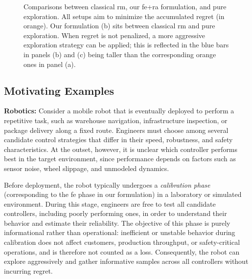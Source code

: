 \documentclass[twoside,11pt]{article}
\begin{document}
\begin{figure}[t]
{{
    }
}
\caption{Comparisons between classical \ac{rm}, our \ac{fe}+\ac{ra} formulation, and pure exploration. All setups aim to minimize the accumulated regret (in orange). Our formulation (b) sits between  classical \ac{rm} and pure exploration. When regret is not penalized, a more aggressive exploration strategy can be applied; this is reflected in the  blue bars in panels (b) and (c) being taller than the corresponding orange ones in panel (a).}
\label{fig:comparison_formulation}
\end{figure}







\subsection{Motivating Examples}\label{sec:examples}
\textbf{Robotics:}
Consider a mobile robot that is eventually deployed to perform a repetitive task, such as warehouse navigation, infrastructure inspection, or package delivery along a fixed route. Engineers must choose among several candidate control strategies that differ in their speed, robustness, and safety characteristics. At the outset, however, it is unclear which controller performs best in the target environment, since performance depends on factors such as sensor noise, wheel slippage, and unmodeled dynamics.

Before deployment, the robot typically undergoes a {\em calibration phase} (corresponding to the \ac{fe} phase in our formulation) in a laboratory or simulated environment. During this stage, engineers are free to test all candidate controllers, including poorly performing ones, in order to understand their behavior and estimate their reliability. The objective of this phase is purely informational rather than operational: inefficient or unstable behavior during calibration does not affect customers, production throughput, or safety-critical operations, and is therefore not counted as a loss. Consequently, the robot can explore aggressively and gather informative samples across all controllers without incurring regret.
\end{document}
